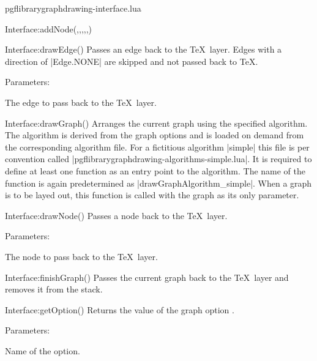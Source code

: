 \begin{filedescription}{pgflibrarygraphdrawing-interface.lua}
\begin{luacommand}{{Interface:addNode}(,,,,,)}
\end{luacommand}\begin{luacommand}{{Interface:drawEdge}()}
Passes an edge back to the \TeX\ layer.  Edges with a direction of |Edge.NONE| are skipped and not passed back to \TeX. 

Parameters:
\begin{parameterdescription}
	\item[\meta{edge}] The edge to pass back to the \TeX\ layer. 
\end{parameterdescription}



\end{luacommand}\begin{luacommand}{{Interface:drawGraph}()}
Arranges the current graph using the specified algorithm.  The algorithm is derived from the graph options and is loaded on demand from the corresponding algorithm file. For a fictitious algorithm |simple| this file is per convention called |pgflibrarygraphdrawing-algorithms-simple.lua|. It is required to define at least one function as an entry point to the algorithm. The name of the function is again predetermined as |drawGraphAlgorithm_simple|. When a graph is to be layed out, this function is called with the graph as its only parameter. 



\end{luacommand}\begin{luacommand}{{Interface:drawNode}()}
Passes a node back to the \TeX\ layer. 

Parameters:
\begin{parameterdescription}
	\item[\meta{node}] The node to pass back to the \TeX\ layer. 
\end{parameterdescription}



\end{luacommand}\begin{luacommand}{{Interface:finishGraph}()}
Passes the current graph back to the \TeX\ layer and removes it from the stack. 



\end{luacommand}\begin{luacommand}{{Interface:getOption}()}
Returns the value of the graph option . 

Parameters:
\begin{parameterdescription}
	\item[\meta{name}] Name of the option. 
\end{parameterdescription}



\end{luacommand}
\end{filedescription}
